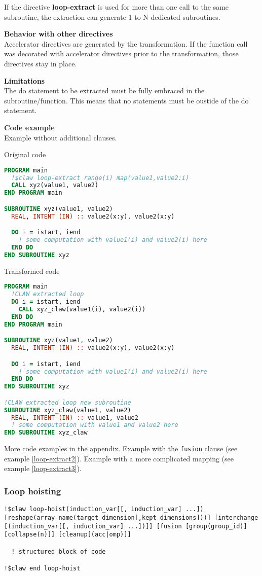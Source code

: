 If the directive \textbf{loop-extract} is used for more than one call to the
same subroutine, the extraction can generate 1 to N dedicated subroutines.

\textbf{Behavior with other directives}\\
Accelerator directives are generated by the transformation. If the function call
was decorated with accelerator directives prior to the transformation, those
directives stay in place.

\textbf{Limitations}\\
The do statement to be extracted must be fully embraced in the
subroutine/function. This means that no statements must be oustide of the do
statement.

\textbf{Code example}\\
\label{loop-extract1}
Example without additional clauses.

Original code
\begin{lstlisting}[language=Fortran]
PROGRAM main
  !$claw loop-extract range(i) map(value1,value2:i)
  CALL xyz(value1, value2)
END PROGRAM main

SUBROUTINE xyz(value1, value2)
  REAL, INTENT (IN) :: value2(x:y), value2(x:y)

  DO i = istart, iend
    ! some computation with value1(i) and value2(i) here
  END DO
END SUBROUTINE xyz
\end{lstlisting}


Transformed code
\begin{lstlisting}[language=Fortran]
PROGRAM main
  !CLAW extracted loop
  DO i = istart, iend
    CALL xyz_claw(value1(i), value2(i))
  END DO
END PROGRAM main

SUBROUTINE xyz(value1, value2)
  REAL, INTENT (IN) :: value2(x:y), value2(x:y)

  DO i = istart, iend
    ! some computation with value1(i) and value2(i) here
  END DO
END SUBROUTINE xyz

!CLAW extracted loop new subroutine
SUBROUTINE xyz_claw(value1, value2)
  REAL, INTENT (IN) :: value1, value2
  ! some computation with value1 and value2 here
END SUBROUTINE xyz_claw
\end{lstlisting}

More code examples in the appendix. Example with the \lstinline!fusion! clause
(see example \ref{loop-extract2}). Example with a more complicated mapping
(see example \ref{loop-extract3}).

\subsubsection{Loop hoisting}
\begin{lstlisting}
!$claw loop-hoist(induction_var[[, induction_var] ...]) [reshape(array_name(target_dimension[,kept_dimensions]))] [interchange [(induction_var[[, induction_var] ...])]] [fusion [group(group_id)] [collapse(n)]] [cleanup[(acc|omp)]]

  ! structured block of code

!$claw end loop-hoist
\end{lstlisting}


